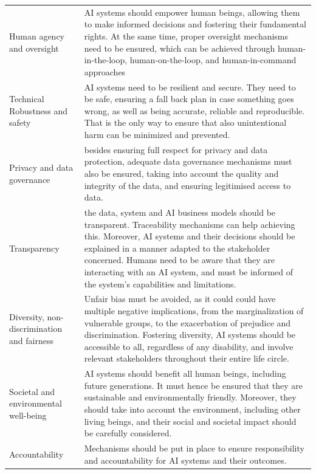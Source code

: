 \documentclass[
  a4paper,
  openany, a4paper, oneside]{book}
\begin{document}
\begin{longtable}[]{@{}
  >{\raggedright\arraybackslash}p{}
  >{\centering\arraybackslash}p{}@{}}
\toprule
& \\
\midrule
\endhead
Human agency and oversight & AI systems should empower human beings, allowing them to make informed decisions and fostering their fundamental rights. At the same time, proper oversight mechanisms need to be ensured, which can be achieved through human-in-the-loop, human-on-the-loop, and human-in-command approaches \\
Technical Robustness and safety & AI systems need to be resilient and secure. They need to be safe, ensuring a fall back plan in case something goes wrong, as well as being accurate, reliable and reproducible. That is the only way to ensure that also unintentional harm can be minimized and prevented. \\
Privacy and data governance & besides ensuring full respect for privacy and data protection, adequate data governance mechanisms must also be ensured, taking into account the quality and integrity of the data, and ensuring legitimised access to data. \\
Transparency & the data, system and AI business models should be transparent. Traceability mechanisms can help achieving this. Moreover, AI systems and their decisions should be explained in a manner adapted to the stakeholder concerned. Humans need to be aware that they are interacting with an AI system, and must be informed of the system's capabilities and limitations. \\
Diversity, non-discrimination and fairness & Unfair bias must be avoided, as it could could have multiple negative implications, from the marginalization of vulnerable groups, to the exacerbation of prejudice and discrimination. Fostering diversity, AI systems should be accessible to all, regardless of any disability, and involve relevant stakeholders throughout their entire life circle. \\
Societal and environmental well-being & AI systems should benefit all human beings, including future generations. It must hence be ensured that they are sustainable and environmentally friendly. Moreover, they should take into account the environment, including other living beings, and their social and societal impact should be carefully considered. \\
Accountability & Mechanisms should be put in place to ensure responsibility and accountability for AI systems and their outcomes. \\
\bottomrule
\end{longtable}
\end{document}
